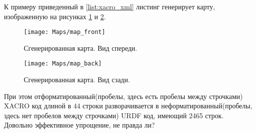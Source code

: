 К примеру приведенный в \ref{list:xacro_xml} листинг генерирует карту, изображенную на рисунках \ref{fig:6_2_1} и \ref{fig:6_2_2}.
\begin{figure}[h!]
	\centering
	\texttt{[image: Maps/map\_front]}
	\caption{Сгенерированная карта. Вид спереди.}
	\label{fig:6_2_1}
\end{figure}
\begin{figure}[h!]
	\centering
	\texttt{[image: Maps/map\_back]}
	\caption{Сгенерированная карта. Вид сзади.}
	\label{fig:6_2_2}
\end{figure}
При этом отформатированный(пробелы, здесь есть пробелы между строчками) XACRO код длиной в 44 строки разворачивается в неформатированный(пробелы, здесь нет пробелов между строчками) URDF код, имеющий 2465 строк. Довольно эффективное упрощение, не правда ли?